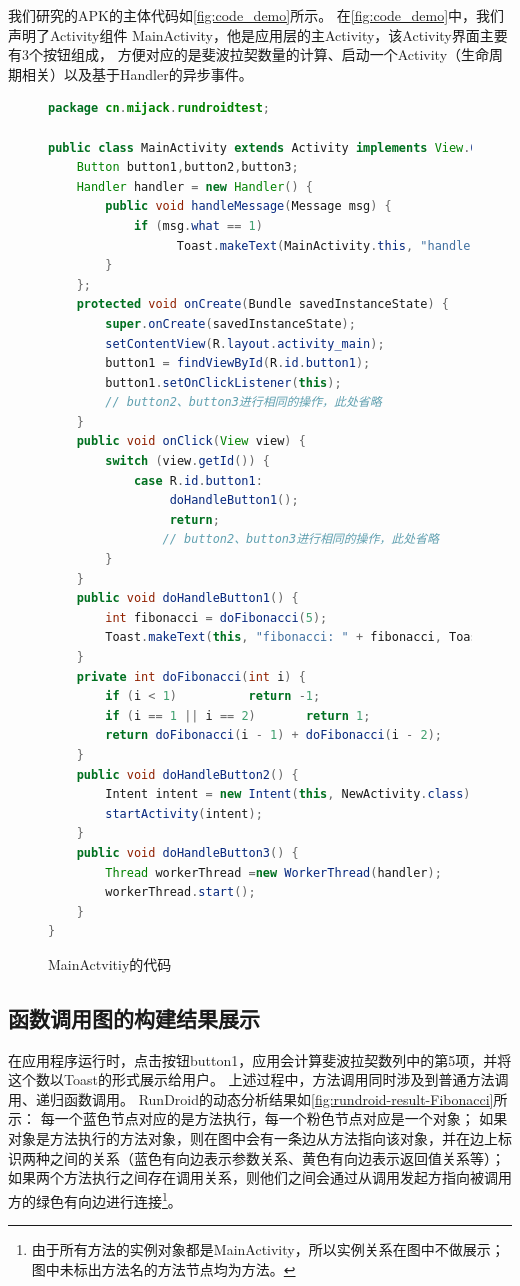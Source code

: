 我们研究的APK的主体代码如\autoref{fig:code_demo}所示。
在\autoref{fig:code_demo}中，我们声明了Activity组件 {MainActivity}，他是应用层的主Activity，该Activity界面主要有3个按钮组成，
方便对应的是斐波拉契数量的计算、启动一个Activity（生命周期相关）以及基于Handler的异步事件。



\begin{figure}[!h]
	\centering
	\begin{lstlisting}[language=Java]
package cn.mijack.rundroidtest;

public class MainActivity extends Activity implements View.OnClickListener {
	Button button1,button2,button3;
	Handler handler = new Handler() {
		public void handleMessage(Message msg) {
			if (msg.what == 1)   
			      Toast.makeText(MainActivity.this, "handle", Toast.LENGTH_SHORT).show();
		}
	};
	protected void onCreate(Bundle savedInstanceState) {
		super.onCreate(savedInstanceState);
		setContentView(R.layout.activity_main);
		button1 = findViewById(R.id.button1);
		button1.setOnClickListener(this);   	
		// button2、button3进行相同的操作，此处省略
	}
	public void onClick(View view) {
		switch (view.getId()) {
			case R.id.button1:		
			     doHandleButton1();		
			     return;				 	
				// button2、button3进行相同的操作，此处省略
		}
	}
	public void doHandleButton1() {
		int fibonacci = doFibonacci(5);
		Toast.makeText(this, "fibonacci: " + fibonacci, Toast.LENGTH_SHORT).show();
	}
	private int doFibonacci(int i) {
		if (i < 1)			return -1;
		if (i == 1 || i == 2) 		return 1;
		return doFibonacci(i - 1) + doFibonacci(i - 2);
	}
	public void doHandleButton2() {
		Intent intent = new Intent(this, NewActivity.class);
		startActivity(intent);
	}
	public void doHandleButton3() {
		Thread workerThread =new WorkerThread(handler);
		workerThread.start();
	}
}\end{lstlisting}
	\caption{MainActvitiy的代码}
	\label{fig:code_demo}
\end{figure}



\subsection{函数调用图的构建结果展示}

在应用程序运行时，点击按钮button1，应用会计算斐波拉契数列中的第5项，并将这个数以Toast的形式展示给用户。
上述过程中，方法调用同时涉及到普通方法调用、递归函数调用。
RunDroid的动态分析结果如\autoref{fig:rundroid-result-Fibonacci}所示：
每一个蓝色节点对应的是方法执行，每一个粉色节点对应是一个对象；
如果对象是方法执行的方法对象，则在图中会有一条边从方法指向该对象，并在边上标识两种之间的关系（蓝色有向边表示参数关系、黄色有向边表示返回值关系等）；
如果两个方法执行之间存在调用关系，则他们之间会通过从调用发起方指向被调用方的绿色有向边进行连接\footnote{由于所有方法的实例对象都是{MainActivity}，所以实例关系在图中不做展示；图中未标出方法名的方法节点均为方法。}。


